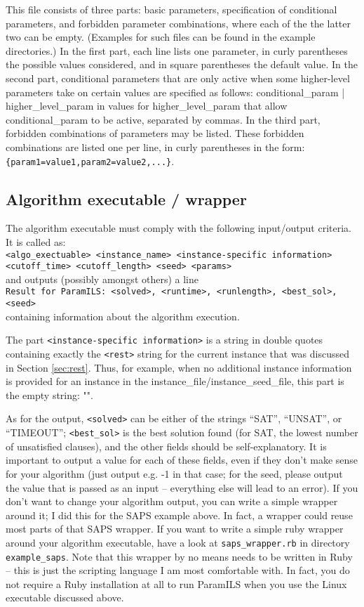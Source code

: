 \documentclass[10pt,letterpaper,twoside]{article}
\begin{document}
This file consists of three parts: basic parameters, specification of conditional parameters, and forbidden parameter combinations, where
each of the the latter two can be empty. (Examples for such files can be found in the example directories.)
In the first part, each line lists one parameter, in curly parentheses the possible values considered,
and in square parentheses the default value.
In the second part, conditional parameters that are only active when some higher-level parameters
take on certain values are specified as follows:
conditional\_param | higher\_level\_param in {values for higher\_level\_param that allow conditional\_param to be active, separated by commas}.
In the third part, forbidden combinations of parameters may be listed. These forbidden combinations are listed one per line, in curly parentheses in the form:
\texttt{\{param1=value1,param2=value2,...\}}.

\subsection{Algorithm executable / wrapper}\label{sec:exec-spec}
The algorithm executable must comply with the following input/output criteria.
It is called as:\\
\texttt{<algo\_exectuable> <instance\_name> <instance-specific information> <cutoff\_time> <cutoff\_length> <seed> <params>}\\
and outputs (possibly amongst others) a line\\
\texttt{Result for ParamILS: <solved>, <runtime>, <runlength>, <best\_sol>, <seed>}\\
containing information about the 
algorithm execution. 

The part \texttt{<instance-specific information>} is a string in double quotes containing exactly the \texttt{<rest>} string for the current instance that was discussed in Section \ref{sec:rest}. Thus, for example, when no additional instance information is provided for an instance in the instance\_file/instance\_seed\_file, this part is the empty string: "".

As for the output, \texttt{<solved>} can be either of the strings ``SAT'', ``UNSAT'', or ``TIMEOUT''; \texttt{<best\_sol>} is the best solution found (for SAT, the lowest number of unsatisfied clauses), and the other fields should be self-explanatory.
It is important to output a value for each of these fields, even if they don't make sense for your algorithm (just output e.g. -1 in that case;
for the seed, please output the value that is passed as an input -- everything else will lead to an error).
If you don't want to change your algorithm output, you can write a simple wrapper around it; I did this for the SAPS example above.
In fact, a wrapper could reuse most parts of that SAPS wrapper. If you want to write a simple ruby wrapper around your algorithm executable, have a look at
\texttt{saps\_wrapper.rb} in directory \texttt{example\_saps}.
Note that this wrapper by no means needs to be written in Ruby -- this is just the scripting language I am most comfortable with. In fact, you do not require a Ruby installation at all to run ParamILS when you use the Linux executable discussed above.
\end{document}
